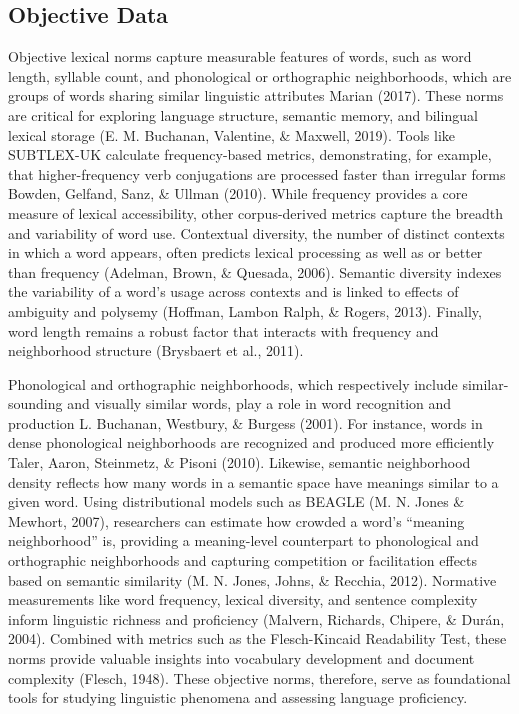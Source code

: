 \documentclass[
  english,
  man,floatsintext]{apa6}
\begin{document}
\subsection{Objective Data}\label{objective-data}

Objective lexical norms capture measurable features of words, such as word length, syllable count, and phonological or orthographic neighborhoods, which are groups of words sharing similar linguistic attributes Marian (2017). These norms are critical for exploring language structure, semantic memory, and bilingual lexical storage (E. M. Buchanan, Valentine, \& Maxwell, 2019). Tools like SUBTLEX-UK calculate frequency-based metrics, demonstrating, for example, that higher-frequency verb conjugations are processed faster than irregular forms Bowden, Gelfand, Sanz, \& Ullman (2010). While frequency provides a core measure of lexical accessibility, other corpus-derived metrics capture the breadth and variability of word use. Contextual diversity, the number of distinct contexts in which a word appears, often predicts lexical processing as well as or better than frequency (Adelman, Brown, \& Quesada, 2006). Semantic diversity indexes the variability of a word's usage across contexts and is linked to effects of ambiguity and polysemy (Hoffman, Lambon Ralph, \& Rogers, 2013). Finally, word length remains a robust factor that interacts with frequency and neighborhood structure (Brysbaert et al., 2011).

Phonological and orthographic neighborhoods, which respectively include similar-sounding and visually similar words, play a role in word recognition and production L. Buchanan, Westbury, \& Burgess (2001). For instance, words in dense phonological neighborhoods are recognized and produced more efficiently Taler, Aaron, Steinmetz, \& Pisoni (2010). Likewise, semantic neighborhood density reflects how many words in a semantic space have meanings similar to a given word. Using distributional models such as BEAGLE (M. N. Jones \& Mewhort, 2007), researchers can estimate how crowded a word's ``meaning neighborhood'' is, providing a meaning-level counterpart to phonological and orthographic neighborhoods and capturing competition or facilitation effects based on semantic similarity (M. N. Jones, Johns, \& Recchia, 2012). Normative measurements like word frequency, lexical diversity, and sentence complexity inform linguistic richness and proficiency (Malvern, Richards, Chipere, \& Durán, 2004). Combined with metrics such as the Flesch-Kincaid Readability Test, these norms provide valuable insights into vocabulary development and document complexity (Flesch, 1948). These objective norms, therefore, serve as foundational tools for studying linguistic phenomena and assessing language proficiency.
\end{document}
